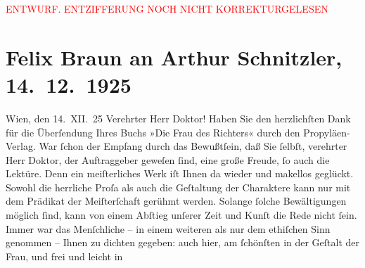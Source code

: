 
\begin{center}
            \textcolor{red}{ENTWURF. ENTZIFFERUNG NOCH NICHT KORREKTURGELESEN}
                      \end{center}
            
               \section[Felix Braun an Arthur Schnitzler, 14. 12. 1925]{ Felix Braun an Arthur Schnitzler, 14. 12. 1925}\nopagebreak{}\rehead{ }\begin{ledgroupsized}[t]{13cm}\normalsize\beginnumbering{} \toendnotes[C]{\smallbreak\pagebreak[2]} 
\toendnotes[C]{\smallbreak}\pstart
           \centering{}{\pb}Wien, den 14. XII. 25\pend
           \pstart{}Verehrter Herr Doktor!\pend\pstart
           Haben Sie den herzlichſten Dank für die Überſendung Ihres Buchs »Die Frau des Richters« durch den Propyläen-Verlag. War ſchon der Empfang durch das
                    Bewußtſein, daß Sie ſelbſt, verehrter Herr Doktor, der Auftraggeber geweſen
                    ſind, eine große Freude, ſo auch die Lektüre. Denn ein meiſterliches Werk iſt
                    Ihnen da wieder und makellos geglückt. Sowohl die herrliche Proſa als auch die
                    Geſtaltung der Charaktere kann nur mit dem Prädikat der Meiſter{\pb}ſchaft gerühmt werden. Solange ſolche Bewältigungen möglich ſind, kann von
                    einem Abſtieg unſerer Zeit und Kunſt die Rede nicht ſein.\pend
           \pstart
           Immer war das Menſchliche – in einem weiteren als nur dem ethiſchen Sinn genommen
                    – Ihnen zu dichten gegeben: auch hier, am ſchönſten in der Geſtalt der Frau, und frei und leicht in

\end{ledgroupsized}
